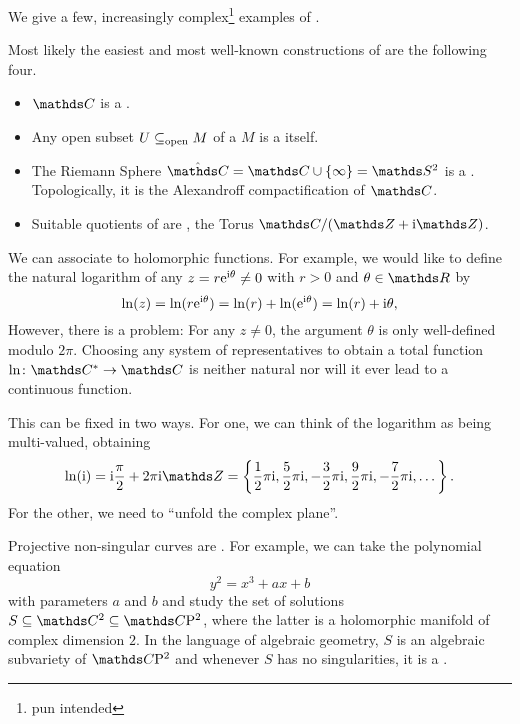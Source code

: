 We give a few, increasingly complex\footnote{pun intended}
examples of \RSs.

\begin{bsp}
Most likely the easiest and most well-known constructions of \RSs
are the following four.
\begin{itemize}
\item \(\C\) is a \RS.
\item Any open subset \(U \subseteq_{\textnormal{open}} M\) of a \RS \(M\) is a \RS itself.
\item The Riemann Sphere \(\hat\C = \C \cup \{\infty\} = \S^2\) is a \RS.
	Topologically, it is the Alexandroff compactification of \(\C\).
\item Suitable quotients of \RSs are \RSs,
	\eg the Torus \(\C / (\Z + \i\Z)\).
\end{itemize}
\end{bsp}

\begin{bsp}
	We can associate \RSs to holomorphic functions.
	For example,
	we would like to define the natural logarithm
	of any \(z = r\mathrm{e}^{\mathrm{i}\theta} \neq 0\)
	with \(r > 0\) and \(\theta \in \R\) by
	\[
		\ln(z)
		= \ln(r\mathrm{e}^{\mathrm{i}\theta})
		= \ln(r) + \ln(\mathrm{e}^{\mathrm{i}\theta})
		= \ln(r) + \mathrm{i}\theta,
	\]
	However, there is a problem:
	For any \(z \neq 0\),
	the argument \(\theta\) is only well-defined modulo \(2\pi\).
	Choosing any system of representatives
	to obtain a total function \(\ln\colon \C^* \to \C\)
	is neither natural nor will it ever lead to a continuous function.

	This can be fixed in two ways.
	For one, we can think of the logarithm as being multi-valued,
	obtaining
	\[
		\ln(\i)
		= \i\frac\pi2+2\pi\i\Z
		= \left\{
			\frac12\pi\i, \frac52\pi\i,
			-\frac32\pi\i, \frac92\pi\i,
			-\frac72\pi\i, \dots
		\right\}.
	\]
	For the other,
	we need \RSs to “unfold the complex plane”.
\end{bsp}

\begin{bsp}
	Projective non-singular curves are \RSs.
	For example, we can take the polynomial equation
	\[y^2 = x^3+ax+b\]
	with parameters \(a\) and \(b\)
	and study the set of solutions \(S \subseteq \C^2 \subseteq \Proj\C2\),
	where the latter is a holomorphic manifold of complex dimension \(2\).
	In the language of algebraic geometry,
	\(S\) is an algebraic subvariety of \(\Proj\C2\)
	and whenever \(S\) has no singularities,
	it is a \RS.
\end{bsp}

